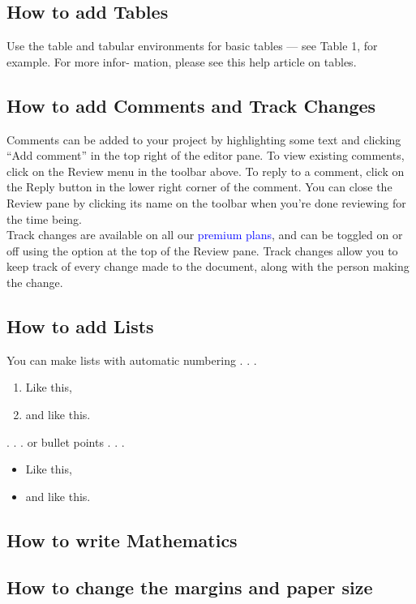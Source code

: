 \documentclass{article}
\begin{document}
	\newpage
	\subsection{How to add Tables}
	Use the table and tabular environments for basic tables — see Table 1, for example. For more infor-
	mation, please see this help article on tables.
	
	\subsection{How to add Comments and Track Changes}
	Comments can be added to your project by highlighting some text and clicking “Add comment” in
	the top right of the editor pane. To view existing comments, click on the Review menu in the toolbar
	above. To reply to a comment, click on the Reply button in the lower right corner of the comment.
	You can close the Review pane by clicking its name on the toolbar when you’re done reviewing for the
	time being.\\
	\hspace{1cm}Track changes are available on all our \textcolor{blue}{premium plans}, and can be toggled on or off using the option
	at the top of the Review pane. Track changes allow you to keep track of every change made to the
	document, along with the person making the change.
	
	\subsection{How to add Lists}
	You can make lists with automatic numbering . . .
	
	\begin{enumerate}
		\item Like this,
		\item and like this.
	\end{enumerate}
	. . . or bullet points . . .
	\begin{itemize}
		\item Like this,
		\item and like this.
	\end{itemize}
	
	\subsection{How to write Mathematics}





	\subsection{How to change the margins and paper size}
	
\end{document}
